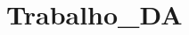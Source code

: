 \chapter{Trabalho\+\_\+\+DA}
\hypertarget{md_README}{}\label{md_README}
\label{md_README_autotoc_md0}%
%
